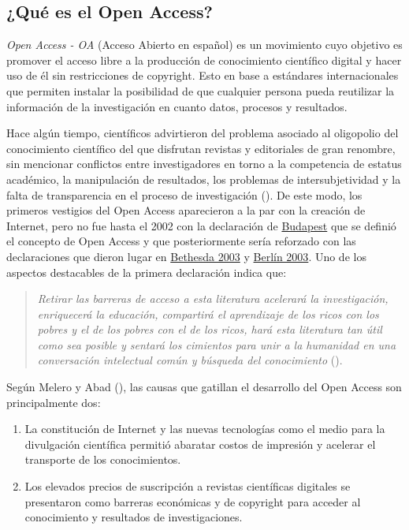\documentclass[
  spanish,
  a4paper,
  oneside]{scrbook}
\begin{document}
\subsection{¿Qué es el Open Access?}\label{quuxe9-es-el-open-access}

\emph{Open Access - OA} (Acceso Abierto en español) es un movimiento
cuyo objetivo es promover el acceso libre a la producción de
conocimiento científico digital y hacer uso de él sin restricciones de
copyright. Esto en base a estándares internacionales que permiten
instalar la posibilidad de que cualquier persona pueda reutilizar la
información de la investigación en cuanto datos, procesos y resultados.

Hace algún tiempo, científicos advirtieron del problema asociado al
oligopolio del conocimiento científico del que disfrutan revistas y
editoriales de gran renombre, sin mencionar conflictos entre
investigadores en torno a la competencia de estatus académico, la
manipulación de resultados, los problemas de intersubjetividad y la
falta de transparencia en el proceso de investigación
(). De este
modo, los primeros vestigios del Open Access aparecieron a la par con la
creación de Internet, pero no fue hasta el 2002 con la declaración de
\href{https://www.budapestopenaccessinitiative.org/translations/spanish-translation/}{Budapest}
que se definió el concepto de Open Access y que posteriormente sería
reforzado con las declaraciones que dieron lugar en
\href{https://ictlogy.net/articles/bethesda_es.html}{Bethesda 2003} y
\href{https://openaccess.mpg.de/67627/Berlin_sp.pdf}{Berlín 2003}. Uno
de los aspectos destacables de la primera declaración indica que:

\begin{quote}
\emph{Retirar las barreras de acceso a esta literatura acelerará la
investigación, enriquecerá la educación, compartirá el aprendizaje de
los ricos con los pobres y el de los pobres con el de los ricos, hará
esta literatura tan útil como sea posible y sentará los cimientos para
unir a la humanidad en una conversación intelectual común y búsqueda del
conocimiento}
().
\end{quote}

Según Melero y Abad (), las
causas que gatillan el desarrollo del Open Access son principalmente
dos:

\begin{enumerate}
\def\labelenumi{\arabic{enumi}.}
\item
  La constitución de Internet y las nuevas tecnologías como el medio
  para la divulgación científica permitió abaratar costos de impresión y
  acelerar el transporte de los conocimientos.
\item
  Los elevados precios de suscripción a revistas científicas digitales
  se presentaron como barreras económicas y de copyright para acceder al
  conocimiento y resultados de investigaciones.
\end{enumerate}
\end{document}
